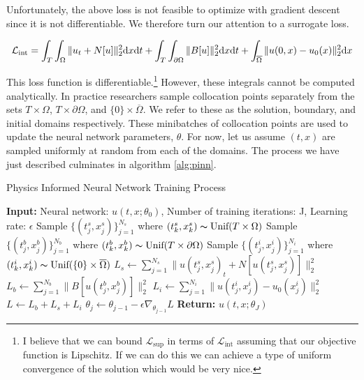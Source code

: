 \documentclass[12pt]{article}
\def\t{\text}
\begin{document}
\noindent Unfortunately, the above loss is not feasible to optimize with gradient descent since it is not differentiable. We therefore turn our attention to a surrogate loss.

\begin{equation} \label{eq:Lint}
    \mathcal{L_{\t{int}}} = \int_{T} \int_{\Omega} \| u_t + N[u] \|_2^2 \t dx \t dt + \int_{T} \int_{\partial \Omega} \|B[u] \|_2^2 \t dx \t dt + \int_{\overline{\Omega}} \|u(0,x) - u_0(x) \|_2^2 \t dx
\end{equation} 

\noindent This loss function is differentiable.\footnote{I believe that we can bound $\mathcal{L}_{\t{sup}}$ in terms of $\mathcal{L}_{\t{int}}$ assuming that our objective function is Lipschitz. If we can do this we can achieve a type of uniform convergence of the solution which would be very nice.} However, these integrals cannot be computed analytically. In practice researchers sample collocation points separately from the sets $T \times \Omega$, $T \times \partial \Omega$, and $\{0\} \times \overline{\Omega}$. We refer to these as the solution, boundary, and initial domains respectively. These minibatches of collocation points are used to update the neural network parameters, $\theta$. For now, let us assume $(t,x)$ are sampled uniformly at random from each of the domains. The process we have just described culminates in algorithm \ref{alg:pinn}. 

\begin{algorithm}
\caption{Physics Informed Neural Network Training Process}\label{alg:pinn}
\begin{algorithmic}
    \State \textbf{Input:} Neural network: $u(t,x;\theta_0)$, Number of training iterations: J, Learning rate: $\epsilon$
    \State Sample $\{(t^s_j,x^s_j)\}_{j=1}^{N_s}$ where $(t^s_k,x^s_k) \thicksim \t{Unif}(T \times \Omega)$ 
    \State Sample $\{(t^b_j,x^b_j)\}_{j=1}^{N_b}$ where $(t^b_k,x^b_k) \thicksim \t{Unif}(T \times \partial \Omega)$ 
    \State Sample $\{(t^i_j,x^i_j)\}_{j=1}^{N_i}$ where $(t^i_k,x^i_k) \thicksim \t{Unif}(\{0\} \times \overline{\Omega})$ 
    \State $L_s \gets \sum_{j=1}^{N_s} \| u(t^s_j,x^s_j)_t + N[u(t^s_j,x^s_j)] \|_2^2$ 
    \State $L_b \gets \sum_{j=1}^{N_b} \| B[u(t^b_j,x^b_j)] \|_2^2$ 
    \State $L_i \gets \sum_{j=1}^{N_i} \| u(t^i_j,x^i_j) - u_0(x^i_j) \|_2^2$ 
    \State $L \gets L_b + L_s + L_i$
    \State $\theta_j \gets \theta_{j-1} - \epsilon \nabla_{\theta_{j-1}} L$
    \EndFor
    \State \textbf{Return:} $u(t,x;\theta_J)$
\end{algorithmic}
\end{algorithm}
\end{document}
